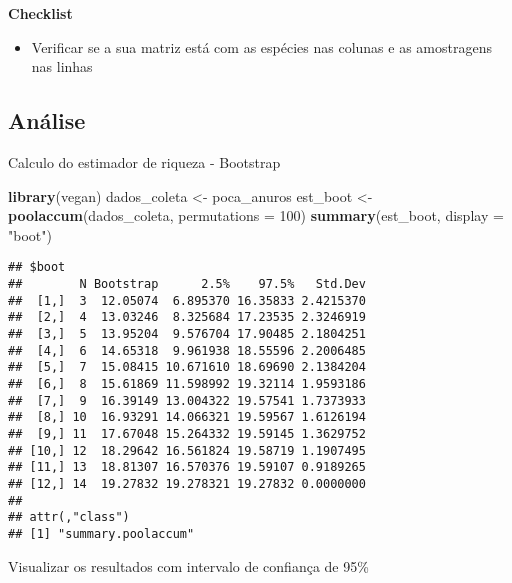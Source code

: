 \documentclass[
]{book}
\newenvironment{Shaded}{\begin{snugshade}}{\end{snugshade}}
\newcommand{\DataTypeTok}[1]{\textcolor[rgb]{0.13,0.29,0.53}{#1}}
\newcommand{\DecValTok}[1]{\textcolor[rgb]{0.00,0.00,0.81}{#1}}
\newcommand{\KeywordTok}[1]{\textcolor[rgb]{0.13,0.29,0.53}{\textbf{#1}}}
\newcommand{\NormalTok}[1]{#1}
\newcommand{\StringTok}[1]{\textcolor[rgb]{0.31,0.60,0.02}{#1}}
\providecommand{\tightlist}{%
  \setlength{\itemsep}{0pt}\setlength{\parskip}{0pt}}
\begin{document}
\textbf{Checklist}

\begin{itemize}
\tightlist
\item
  Verificar se a sua matriz está com as espécies nas colunas e as amostragens nas linhas
\end{itemize}

\hypertarget{anuxe1lise-7}{%
\subsection{Análise}\label{anuxe1lise-7}}

Calculo do estimador de riqueza - Bootstrap

\begin{Shaded}
\begin{Highlighting}[]
\KeywordTok{library}\NormalTok{(vegan)}
\NormalTok{dados_coleta <-}\StringTok{ }\NormalTok{poca_anuros}
\NormalTok{est_boot <-}\StringTok{ }\KeywordTok{poolaccum}\NormalTok{(dados_coleta, }\DataTypeTok{permutations =} \DecValTok{100}\NormalTok{)}
\KeywordTok{summary}\NormalTok{(est_boot, }\DataTypeTok{display =} \StringTok{"boot"}\NormalTok{)}
\end{Highlighting}
\end{Shaded}

\begin{verbatim}
## $boot
##        N Bootstrap      2.5%    97.5%   Std.Dev
##  [1,]  3  12.05074  6.895370 16.35833 2.4215370
##  [2,]  4  13.03246  8.325684 17.23535 2.3246919
##  [3,]  5  13.95204  9.576704 17.90485 2.1804251
##  [4,]  6  14.65318  9.961938 18.55596 2.2006485
##  [5,]  7  15.08415 10.671610 18.69690 2.1384204
##  [6,]  8  15.61869 11.598992 19.32114 1.9593186
##  [7,]  9  16.39149 13.004322 19.57541 1.7373933
##  [8,] 10  16.93291 14.066321 19.59567 1.6126194
##  [9,] 11  17.67048 15.264332 19.59145 1.3629752
## [10,] 12  18.29642 16.561824 19.58719 1.1907495
## [11,] 13  18.81307 16.570376 19.59107 0.9189265
## [12,] 14  19.27832 19.278321 19.27832 0.0000000
## 
## attr(,"class")
## [1] "summary.poolaccum"
\end{verbatim}

Visualizar os resultados com intervalo de confiança de 95\%
\end{document}
